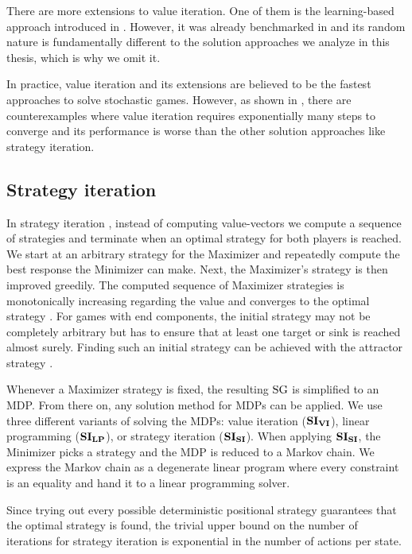 There are more extensions to value iteration. One of them is the learning-based approach introduced in \cite{learningBased}.
However, it was already benchmarked in \cite{gandalf} and its random nature is fundamentally different to the 
solution approaches we analyze in this thesis, which is why we omit it.

In practice, value iteration and its extensions are believed to be the fastest approaches to solve stochastic games.
However, as shown in \cite{viExponential}, there are counterexamples where value iteration requires exponentially many steps to converge and its performance is worse than the other solution approaches like strategy iteration.

\subsection{Strategy iteration}
In strategy iteration \cite{HoffmanKarp}\cite{condonQP}, instead of computing value-vectors we compute a sequence of strategies and terminate when an optimal strategy for both players is reached.
We start at an arbitrary strategy for the Maximizer and repeatedly compute the best response the Minimizer can make. Next, the Maximizer's strategy is then improved greedily.
The computed sequence of Maximizer strategies is monotonically increasing regarding the value and converges to the optimal strategy \cite[Theorem3]{correctnessSI}.
For games with end components, the initial strategy may not be completely arbitrary but has to ensure that at least one target or sink is reached almost surely.
Finding such an initial strategy can be achieved with the attractor strategy \cite[Section 5.3]{correctnessSI}.

Whenever a Maximizer strategy is fixed, the resulting $\textrm{SG}$ is simplified to an MDP. 
From there on, any solution method for MDPs can be applied.
We use three different variants of solving the MDPs: value iteration ($\mathbf{SI_{VI}}$), linear programming \cite{Puterman} ($\mathbf{SI_{LP}}$),
or strategy iteration ($\mathbf{SI_{SI}}$). When applying $\mathbf{SI_{SI}}$, the Minimizer picks a strategy and the MDP is reduced to a Markov chain.
We express the Markov chain as a degenerate linear program where every constraint is an equality and hand it to a linear programming solver. 

Since trying out every possible deterministic positional strategy guarantees that the optimal strategy is found,
the trivial upper bound on the number of iterations for strategy iteration is exponential in the number of actions per state.

